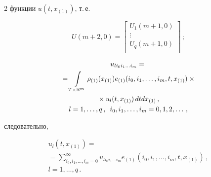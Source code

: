 \begin{multicols}{2}
функции $u(t,x_{(1)})$, т.\,е.








\noindent


\begin{equation}


\label{eqDefUm2}


  U(m+2,0) = \begin{bmatrix}


      U_1(m+1,0) \\


      \vdots     \\


      U_q(m+1,0) \\


\end{bmatrix}\,;


\end{equation}





\vspace*{-12pt}





\noindent


\begin{multline*}


  u_{l i_0 i_1 \dots i_m} =  {}\\


  {}=


  \int\limits_{T \times \mathbb{R}^m} \rho_{(1)}(x_{(1)}) e_{(1)}(i_0,i_1,\dots,i_m,t,x_{(1)}) \times{}\\


  {}\times u_l(t,x_{(1)})\, dt dx_{(1)}\,, \\


  l = 1,\dots,q\,, \enskip i_0,i_1,\dots,i_m = 0,1,2,\dots\,,


\end{multline*}


следовательно,


\begin{multline}


\label{eqUInvert}


  u_l(t,x_{(1)}) ={}\\


  {}= \sum\limits_{i_0,i_1,\dots,i_m = 0}^\infty u_{l i_0 i_1 \dots i_m}  


  e_{(1)}(i_0,i_1,\dots,i_m,t,x_{(1)})\,, \\ l = 1,\dots,q\,.



\end{multline}
\end{multicols}
